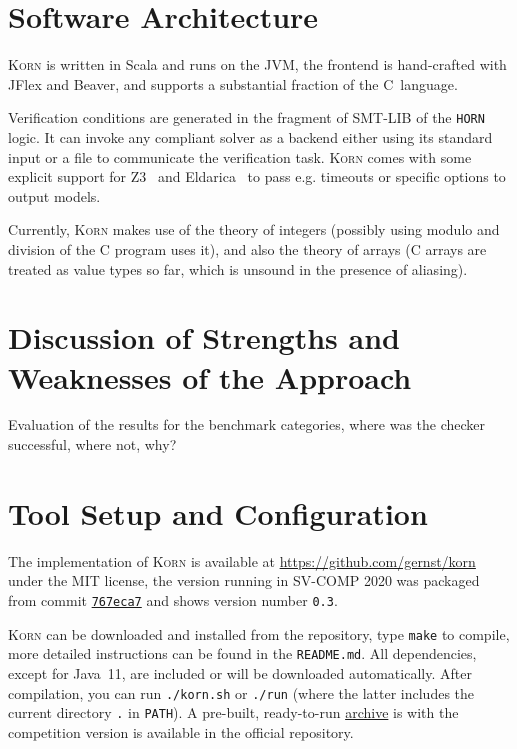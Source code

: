 \documentclass{llncs}
\newcommand{\Korn}{\textsc{Korn}\xspace}
\begin{document}
\section{Software Architecture}
\label{sec:architecture}

\Korn is written in Scala and runs on the JVM,
the frontend is hand-crafted with JFlex and Beaver,
and supports a substantial fraction of the C~language.

Verification conditions are generated in the fragment of SMT-LIB of the \texttt{HORN} logic.
It can invoke any compliant solver as a backend either using its standard input or a file to communicate the verification task.
\Korn comes with some explicit support for Z3~\cite{gurfinkel2019science} and Eldarica~\cite{hojjat2018eldarica}
to pass e.g. timeouts or specific options to output models.

Currently, \Korn makes use of the theory of integers (possibly using modulo and division of the C program uses it),
and also the theory of arrays (C arrays are treated as value types so far, which is unsound in the presence of aliasing).

\section{Discussion of Strengths and Weaknesses of the Approach}
\label{sec:discussion}

Evaluation of the results for the benchmark categories, where was the checker successful, where not, why?

\section{Tool Setup and Configuration}
\label{sec:project}

The implementation of \Korn is available at
    \url{https://github.com/gernst/korn} under the MIT license,
the version running in SV-COMP 2020 was packaged from commit
\href{https://github.com/gernst/korn/commit/767eca718edf7f04e995142b679762242c68eef5}{\tt 767eca7}
and shows version number \texttt{0.3}.

\Korn can be downloaded and installed from the repository, type \texttt{make} to compile,
more detailed instructions can be found in the \texttt{README.md}.
All dependencies, except for Java~11, are included or will be downloaded automatically.
After compilation, you can run \texttt{./korn.sh} or \texttt{./run}
(where the latter includes the current directory \texttt{.} in \texttt{PATH}).
A pre-built, ready-to-run
\href{https://gitlab.com/gernst/svcomp-archives-2021/-/blob/master/2021/korn.zip}{archive}
is with the competition version is available in the official repository.
\end{document}
